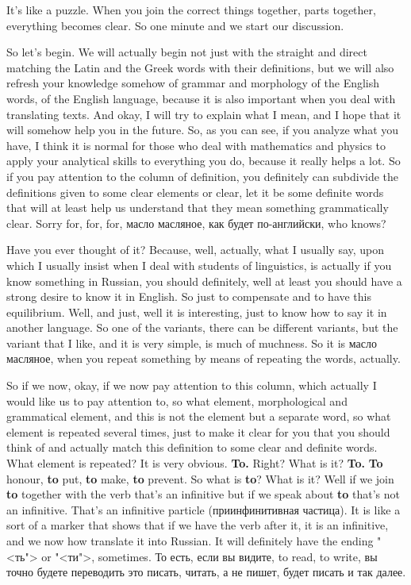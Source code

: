 \documentclass[main.tex]{subfiles}
\begin{document}
It's like a puzzle.
When you join the correct things together, parts together, everything becomes clear.
So one minute and we start our discussion.

So let's begin.
We will actually begin not just with the straight and direct matching the Latin and the Greek words with their definitions, but we will also refresh your knowledge somehow of grammar and morphology of the English words, of the English language, because it is also important when you deal with translating texts.
And okay, I will try to explain what I mean, and I hope that it will somehow help you in the future.
So, as you can see, if you analyze what you have, I think it is normal for those who deal with mathematics and physics to apply your analytical skills to everything you do, because it really helps a lot.
So if you pay attention to the column of definition, you definitely can subdivide the definitions given to some clear elements or clear, let it be some definite words that will at least help us understand that they mean something grammatically clear.
Sorry for, for, for, масло масляное, как будет по-английски, who knows?

Have you ever thought of it?
Because, well, actually, what I usually say, upon which I usually insist when I deal with students of linguistics, is actually if you know something in Russian, you should definitely, well at least you should have a strong desire to know it in English.
So just to compensate and to have this equilibrium.
Well, and just, well it is interesting, just to know how to say it in another language.
So one of the variants, there can be different variants, but the variant that I like, and it is very simple, is much of muchness.
So it is масло масляное, when you repeat something by means of repeating the words, actually.

So if we now, okay, if we now pay attention to this column, which actually I would like us to pay attention to, so what element, morphological and grammatical element, and this is not the element but a separate word, so what element is repeated several times, just to make it clear for you that you should think of and actually match this definition to some clear and definite words.
What element is repeated? It is very obvious.
\textbf{To.}
Right? What is it? \textbf{To.}
\textbf{To} honour, \textbf{to} put, \textbf{to} make, \textbf{to} prevent.
So what is \textbf{to}?
What is it?
Well if we join \textbf{to} together with the verb that's an infinitive but if we speak about \textbf{to} that's not an infinitive.
That's an infinitive particle (приинфинитивная частица).
It is like a sort of a marker that shows that if we have the verb after it, it is an infinitive, and we now how translate it into Russian.
It will definitely have the ending "<ть"> or "<ти">, sometimes.
То есть, если вы видите, to read, to write, вы точно будете переводить это писать, читать, а не пишет, будет писать и так далее.
\end{document}
